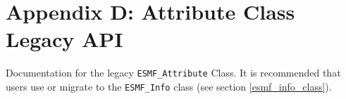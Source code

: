 %

\section{Appendix D:  Attribute Class Legacy API}
\label{appendix_attribute_legacy_api}

Documentation for the legacy \texttt{ESMF\_Attribute} Class. It is recommended that users use or migrate to the \texttt{ESMF\_Info} class (see section \ref{esmf_info_class}).




